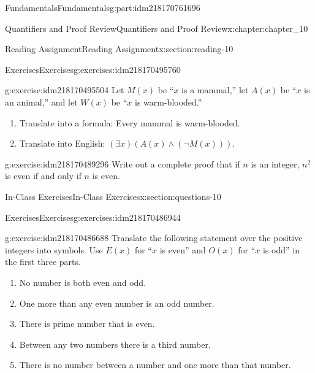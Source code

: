 \documentclass[oneside,10pt,]{book}
\numberwithin{equation}{section}
\begin{document}
\begin{partptx}{Fundamentals}{}{Fundamentals}{}{}{g:part:idm218170761696}
\begin{chapterptx}{Quantifiers and Proof Review}{}{Quantifiers and Proof Review}{}{}{x:chapter:chapter_10}
\begin{sectionptx}{Reading Assignment}{}{Reading Assignment}{}{}{x:section:reading-10}
\begin{exercises-subsection-numberless}{Exercises}{}{Exercises}{}{}{g:exercises:idm218170495760}
\begin{exercisegroup}
\begin{divisionexerciseeg}{1}{}{}{g:exercise:idm218170495504}
Let \(M(x)\) be ``\(x\) is a mammal,'' let \(A(x)\) be ``\(x\) is an animal,'' and let \(W(x)\) be ``\(x\) is warm-blooded.''%
\par
%
\begin{enumerate}[label=(\alph*)]
\item{}Translate into a formula: Every mammal is warm-blooded.%
\item{}Translate into English: \((\exists x)(A(x) \land  (\neg M(x)))\).%
\end{enumerate}
%
\end{divisionexerciseeg}%
\begin{divisionexerciseeg}{2}{}{}{g:exercise:idm218170489296}%
Write out a complete proof that if \(n\) is an integer, \(n^2\) is even if and only if \(n\) is even.%
\end{divisionexerciseeg}%
\end{exercisegroup}
\par\medskip\noindent
\end{exercises-subsection-numberless}
\end{sectionptx}
%
%
\typeout{************************************************}
\typeout{************************************************}
%
\begin{sectionptx}{In-Class Exercises}{}{In-Class Exercises}{}{}{x:section:questions-10}
%
%
%
\typeout{************************************************}
\typeout{************************************************}
%
\begin{exercises-subsection-numberless}{Exercises}{}{Exercises}{}{}{g:exercises:idm218170486944}
\par\medskip\noindent%
%
\begin{exercisegroup}
\begin{divisionexerciseeg}{1}{}{}{g:exercise:idm218170486688}%
Translate the following statement over the positive integers into symbols. Use \(E(x)\) for ``\(x\) is even'' and \(O(x)\) for ``\(x\) is odd'' in the first three parts.%
\begin{enumerate}[label=(\alph*)]
\item{}No number is both even and odd.%
\item{}One more than any even number is an odd number.%
\item{}There is prime number that is even.%
\item{}Between any two numbers there is a third number.%
\item{}There is no number between a number and one more than that number.%

\end{enumerate}
\end{divisionexerciseeg}
\end{exercisegroup}
\end{exercises-subsection-numberless}
\end{sectionptx}
\end{chapterptx}
\end{partptx}
\end{document}
